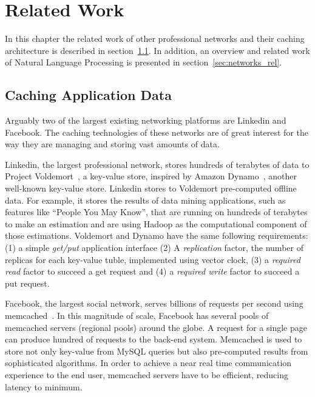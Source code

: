\chapter{Related Work}
\label{sec:related}
In this chapter the related work of other professional networks and their caching architecture is described in section~\ref{sec:caching_rel}. In addition, an overview and related work of Natural Language Processing is presented in section~\ref{sec:networks_rel}. 

\section{Caching Application Data}
\label{sec:caching_rel}
Arguably two of the largest existing networking platforms are Linkedin and Facebook. The caching technologies of these networks are of great interest for the way they are managing and storing vast amounts of data.

Linkedin, the largest professional network, stores hundreds of terabytes of data to Project Voldemort~\cite{sumbaly2012serving}, a key-value store, inspired by Amazon Dynamo~\cite{decandia2007dynamo}, another well-known key-value store. Linkedin stores to Voldemort pre-computed offline data. For example, it stores the results of data mining applications, such as features like ``People You May Know'', that are running on hundreds of terabytes to make an estimation and are using Hadoop as the computational component of those estimations. 
Voldemort and Dynamo have the same following requirements: (1) a simple \emph{get/put} application interface (2) A \emph{replication} factor, the number of replicas for each key-value tuble, implemented using vector clock, (3) a \emph{required read} factor to succeed a get request and (4) a \emph{required write} factor to succeed a put request. 

Facebook, the largest social network, serves billions of requests per second using memcached~\cite{nishtala2013scaling}. In this magnitude of scale, Facebook has several pools of memcached servers (regional pools) around the globe. A request for a single page can produce hundred of requests to the back-end system. Memcached is used to store not only key-value from MySQL queries but also pre-computed results from sophisticated algorithms. 
In order to achieve a near real time communication experience to the end user, memcached servers have to be efficient, reducing latency to minimum. 


